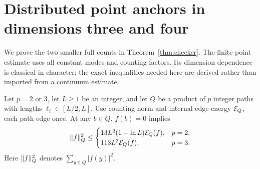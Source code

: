 \section{Distributed point anchors in dimensions three and four}\label{sec:points}
We prove the two smaller full counts in Theorem~\ref{thm:checker}.
The finite point estimate uses all constant modes and counting factors.
Its dimension dependence is classical in character; the exact inequalities
needed here are derived rather than imported from a continuum estimate.

\begin{lemma}\label{lem:point}
Let $p=2$ or $3$, let $L\geq1$ be an integer, and let $Q$ be a product of
$p$ integer paths with lengths $\ell_i\in[L/2,L]$. Use counting norm and
internal edge energy $\mathcal E_Q$, each path edge once. At any $b\in Q$,
$f(b)=0$ implies
\begin{equation}\label{eq:pointbox}
 \lVert f\rVert_Q^2\leq
 \begin{cases}
 13L^2(1+\ln L)\mathcal E_Q(f),&p=2,\\
 113L^3\mathcal E_Q(f),&p=3.
 \end{cases}
\end{equation}
Here $\lVert f\rVert_Q^2$ denotes $\sum_{y\in Q}|f(y)|^2$.
\end{lemma}
